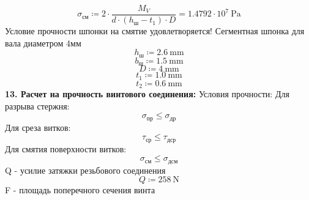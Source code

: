 \documentclass{article}
\newcommand{\defeq}{\coloneq} %
\begin{document}
\begin{equation*}
σ_{см} \defeq 2 \cdot \frac{M_{V}}{d \cdot \left( h_{ш}-\textit{t}_{\textit{1}} \right) \cdot D} = {1.4792 \cdot 10^{7} \: \mathrm{Pa}}
\end{equation*}
\colorbox[HTML]{FFFF80}{Условие прочности шпонки на смятие удовлетворяется!}\newline
\colorbox[HTML]{000000}{Сегментная шпонка для вала диаметром 4мм}\newline
\begin{equation*}
h_{ш} \defeq 2.6 \: \mathrm{mm}
\end{equation*}
\begin{equation*}
b_{ш} \defeq 1.5 \: \mathrm{mm}
\end{equation*}
\begin{equation*}
D \defeq 4 \: \mathrm{mm}
\end{equation*}
\begin{equation*}
\textit{t}_{\textit{1}} \defeq 1.0 \: \mathrm{mm}
\end{equation*}
\begin{equation*}
\textit{t}_{\textit{2}} \defeq 0.6 \: \mathrm{mm}
\end{equation*}
\colorbox[HTML]{000000}{\textbf{13. Расчет на прочность винтового соединения:}}\newline
\colorbox[HTML]{000000}{Условия прочности:}\newline
\colorbox[HTML]{000000}{Для разрыва стержня:}\newline
\begin{equation*}
σ_{пр} \leq σ_{др}
\end{equation*}
\colorbox[HTML]{000000}{Для среза витков:}\newline
\begin{equation*}
τ_{ср} \leq τ_{дср}
\end{equation*}
\colorbox[HTML]{000000}{Для смятия поверхности витков:}\newline
\begin{equation*}
σ_{см} \leq σ_{дсм}
\end{equation*}
\colorbox[HTML]{000000}{Q - усилие затяжки резьбового соединения}\newline
\begin{equation*}
Q \defeq 258 \: \mathrm{N}
\end{equation*}
\colorbox[HTML]{000000}{F - площадь поперечного сечения винта}\newline
\end{document}
